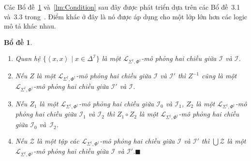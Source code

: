 \documentclass[12pt,a4paper,twoside]{report}
\newcommand{\mL}		{\mathcal{L}}
\newcommand{\mI}		{\mathcal{I}}
\newcommand{\mLSPD}		{\mL_{\Sigma^\dag,\Phi^\dag}}
\newcommand{\myend}		{\mbox{}\hfill\mbox{{\scriptsize$\!\blacksquare$}}}
\newcommand{\tuple}[1]	{\left\langle#1\right\rangle\!}
\newtheorem{Lemma}{Bổ đề}[chapter]
\theoremstyle{definition}
\begin{document}
Các Bổ đề~\ref{lm:Bisimulation} và~\ref{lm:Condition} sau đây được phát triển dựa trên các Bổ đề~3.1 và~3.3 trong~\cite{Divroodi2011B}. Điểm khác ở đây là nó được áp dụng cho một lớp lớn hơn các logic mô tả khác nhau.
\begin{Lemma}
\label{lm:Bisimulation}
~
\begin{enumerate}
  \item Quan hệ $\{\tuple{x,x} \mid x \in \Delta^\mI\}$ là một $\mLSPD$-mô phỏng hai chiều giữa $\mI$ và $\mI$.\label{lm:item1}
%  
  \item Nếu $Z$ là một $\mLSPD$-mô phỏng hai chiều giữa $\mI$ và $\mI'$ thì $Z^{-1}$ cũng là một $\mLSPD$-mô phỏng hai chiều giữa $\mI'$ và $\mI$.\label{lm:item2}
%  
  \item Nếu $Z_1$ là một $\mLSPD$-mô phỏng hai chiều giữa $\mI_0$ và $\mI_1$, $Z_2$ là một $\mLSPD$-mô phỏng hai chiều giữa $\mI_1$ và $\mI_2$ thì $Z_1 \circ Z_2$ là một $\mLSPD$-mô phỏng hai chiều giữa $\mI_0$ và~$\mI_2$.\label{lm:item3}
%
  \item Nếu $\mathcal{Z}$ là một tập các $\mLSPD$-mô phỏng hai chiều giữa $\mI$ và $\mI'$ thì $\bigcup \mathcal{Z}$ là một $\mLSPD$-mô phỏng hai chiều giữa $\mI$ và $\mI'$.\label{lm:item4}\myend
\end{enumerate}
\end{Lemma}
\end{document}
